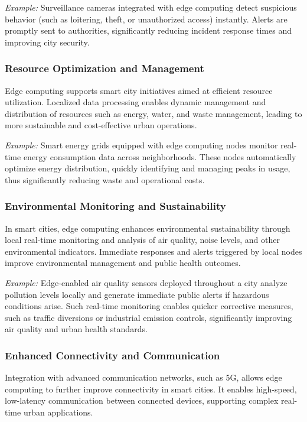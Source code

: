 \documentclass[runningheads]{llncs}
\begin{document}
\noindent\textit{Example:} Surveillance cameras integrated with edge computing detect suspicious behavior (such as loitering, theft, or unauthorized access) instantly. Alerts are promptly sent to authorities, significantly reducing incident response times and improving city security.

\subsubsection{Resource Optimization and Management}
Edge computing supports smart city initiatives aimed at efficient resource utilization. Localized data processing enables dynamic management and distribution of resources such as energy, water, and waste management, leading to more sustainable and cost-effective urban operations.

\noindent\textit{Example:} Smart energy grids equipped with edge computing nodes monitor real-time energy consumption data across neighborhoods. These nodes automatically optimize energy distribution, quickly identifying and managing peaks in usage, thus significantly reducing waste and operational costs.

\subsubsection{Environmental Monitoring and Sustainability}
In smart cities, edge computing enhances environmental sustainability through local real-time monitoring and analysis of air quality, noise levels, and other environmental indicators. Immediate responses and alerts triggered by local nodes improve environmental management and public health outcomes.

\noindent\textit{Example:} Edge-enabled air quality sensors deployed throughout a city analyze pollution levels locally and generate immediate public alerts if hazardous conditions arise. Such real-time monitoring enables quicker corrective measures, such as traffic diversions or industrial emission controls, significantly improving air quality and urban health standards.

\subsubsection{Enhanced Connectivity and Communication}
Integration with advanced communication networks, such as 5G, allows edge computing to further improve connectivity in smart cities. It enables high-speed, low-latency communication between connected devices, supporting complex real-time urban applications.
\end{document}
